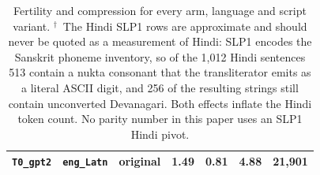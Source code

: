 \begin{table}[t]
\begin{tabular}{lllrrrr}
\texttt{T0\_gpt2} & \texttt{eng\_Latn} & original & 1.49 & 0.81 & 4.88 & 21,901 \\
\bottomrule
\end{tabular}
\caption{Fertility and compression for every arm, language and script variant. $^{\dagger}$~The Hindi SLP1 rows are approximate and should never be quoted as a measurement of Hindi: SLP1 encodes the Sanskrit phoneme inventory, so of the 1,012 Hindi sentences 513 contain a nukta consonant that the transliterator emits as a literal ASCII digit, and 256 of the resulting strings still contain unconverted Devanagari. Both effects inflate the Hindi token count. No parity number in this paper uses an SLP1 Hindi pivot.}
\label{tab:fertcompfull}
\end{table}
